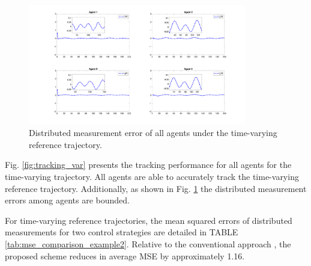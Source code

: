 \documentclass[journal,onecolumn]{IEEEtran}
\begin{document}
\begin{figure}[H]
    \centering
    \includegraphics[width=0.85\textwidth]{var_error.png}
    \caption{Distributed measurement error of all agents under the time-varying reference trajectory.}
    \label{fig:error_var} %
\end{figure}

Fig. \ref{fig:tracking_var} presents the tracking performance for all agents for the time-varying trajectory. All agents are able to accurately track the time-varying reference trajectory. Additionally, as shown in Fig. \ref{fig:error_var} the distributed measurement errors among agents are bounded.

For time-varying reference trajectories, the mean squared errors of distributed
measurements for two control strategies are detailed in TABLE \ref{tab:mse_comparison_example2}. Relative to the
conventional approach \cite{1}, the proposed scheme reduces in average MSE by approximately 1.16.

\begin{table}[H]
    \centering
    \caption{Mean square error comparison (Example 2)}
    \label{tab:mse_comparison_example2}
\end{table}
\end{document}
